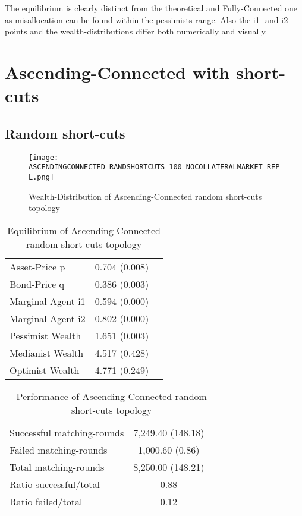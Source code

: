 \documentclass[Bachelorarbeit.tex]{subfiles}
\begin{document}
The equilibrium is clearly distinct from the theoretical and Fully-Connected one as misallocation can be found within the pessimists-range. Also the i1- and i2-points and the wealth-distributions differ both numerically and visually. 

\section{Ascending-Connected with short-cuts}
\label{app:results_acShortCuts}

\subsection{Random short-cuts}
\begin{figure}[H]
	\centering
  \texttt{[image: ASCENDINGCONNECTED\_RANDSHORTCUTS\_100\_NOCOLLATERALMARKET\_REPL.png]}
	\caption{Wealth-Distribution of Ascending-Connected random short-cuts topology}
	\label{fig:wealth_ASCENDINGCONNECTED_RANDSHORTCUTS_100_NOCOLLATERALMARKET_REPL}
\end{figure}

\begin{table}[H]
	\caption{Equilibrium of Ascending-Connected random short-cuts topology}
	\centering
	\begin{tabular} { l c r }
		\hline
		Asset-Price p & 0.704 (0.008) \\
		Bond-Price q & 0.386 (0.003) \\
		Marginal Agent i1 & 0.594 (0.000) \\
		Marginal Agent i2 & 0.802 (0.000) \\
		\hline
		Pessimist Wealth & 1.651 (0.003) \\
		Medianist Wealth & 4.517 (0.428) \\
		Optimist Wealth & 4.771 (0.249) \\
		\hline
	\end{tabular}
\end{table} 

\begin{table}[H]
	\caption{Performance of Ascending-Connected random short-cuts topology}
	\centering
	\begin{tabular} { l c r }
		\hline
		Successful matching-rounds & 7,249.40 (148.18) \\
		Failed matching-rounds & 1,000.60 (0.86) \\
		Total matching-rounds & 8,250.00 (148.21) \\
		\hline
		Ratio successful/total & 0.88 \\
		Ratio failed/total & 0.12 \\
		\hline
	\end{tabular}
\end{table}
\end{document}

